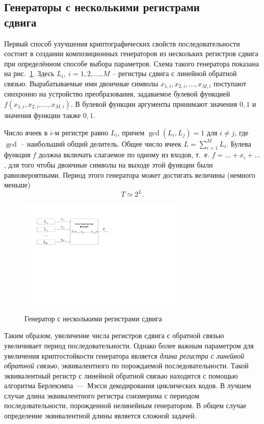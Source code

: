 \subsection[Генераторы с несколькими регистрами сдвига]{Генераторы с несколькими регистрами \protect\\ сдвига}

Первый способ улучшения криптографических свойств последовательности состоит в создании композиционных генераторов из нескольких регистров сдвига при определённом способе выбора параметров. Схема такого генератора показана на рис.~\ref{fig:generators}. Здесь $L_i, ~ i = 1, 2, \dots, M$ -- регистры сдвига с линейной обратной связью. Вырабатываемые ими двоичные символы $x_{1,i}, x_{2,i},  \dots, x_{M,i}$ поступают синхронно на устройство преобразования, задаваемое булевой функцией $f(x_{1,i}, x_{2,i}, \dots, x_{M,i})$. В булевой функции аргументы принимают значения $0,1$ и значения функции также $0,1$.

Число ячеек в $i$-м регистре равно $L_{i}$, причем $\gcd(L_i, L_j)=1$ для $i \neq j$, где $\gcd$ -- наибольший общий делитель. Общее число ячеек $L = \sum\limits_{i=1}^M L_i$. Булева функция $f$ должна включать слагаемое по одному из входов, т.~е. $f = \dots + x_i + \dots$, для того чтобы двоичные символы на выходе этой функции были равновероятными. Период этого генератора может достигать величины (немного меньше)
    \[ T \simeq 2^L. \]

\begin{figure}[!ht]
	\centering
	\includegraphics[width=0.7\textwidth]{pic/generators}
    \caption{Генератор с несколькими регистрами сдвига\label{fig:generators}}
\end{figure}

Таким образом, увеличение числа регистров сдвига с обратной связью увеличивает период последовательности. Однако более важным параметром для увеличения криптостойкости генератора является \emph{ длина регистра с линейной обратной связью}, эквивалентного по порождаемой последовательности. Такой эквивалентный регистр с линейной обратной связью находится с помощью алгоритма Берлекэмпа~---~Мэсси декодирования циклических кодов. В лучшем случае длина эквивалентного регистра соизмерима с периодом последовательности, порожденной нелинейным генератором. В общем случае определение эквивалентной длины является сложной задачей.
